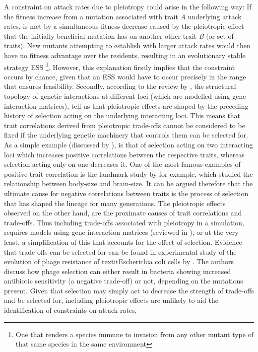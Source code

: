 \documentclass[a4paper]{report}
\begin{document}
 A constraint on attack rates due to pleiotropy could arise in the following way: If the fitness increase from a mutation associated with trait \textit{A} underlying attack rates, is met by a simultaneous fitness decrease caused by the pleiotropic effect that the initially beneficial mutation has on another other trait \textit{B} (or set of traits). New mutants attempting to establish with larger attack rates would then have no fitness advantage over the residents, resulting in an evolutionary stable strategy ESS \footnote{One that renders a species immune to invasion from any other mutant type of that same species in the same environment}. However, this explanation firstly implies that the constraint occurs by chance, given that an ESS would have to occur precisely in the range that ensures feasibility. Secondly, according to the review by \citep{Cheverud2015}, the structural topology of genetic interactions at different loci (which are modelled using gene interaction matrices), tell us that pleiotropic effects are shaped by the preceding history of selection acting on the underlying interacting loci. This means that trait correlations derived from pleiotropic trade-offs cannot be considered to be fixed if the underlying genetic machinery that controls them can be selected for. As a simple example (discussed by \citep{Cheverud2015}), is that of selection acting on two interacting loci which increases positive correlations between the respective traits, whereas selection acting only on one decreases it. One of the most famous examples of positive trait correlation is the landmark study by \citep{Lande1979} for example, which studied the relationship between body-size and brain-size. It can be argued therefore that the ultimate cause for negative correlations between traits is the process of selection that has shaped the lineage for many generations. The pleiotropic effects observed on the other hand, are the proximate causes of trait correlations and trade-offs. Thus including trade-offs associated with pleiotropy in a simulation, requires models using gene interaction matrices (reviewed in \citep{Cheverud2015}), or at the very least, a simplification of this that accounts for the effect of selection. Evidence that trade-offs can be selected for can be found in experimental study of the evolution of phage resistance of textit{Escherichia coli} cells by \citep{Burmeister2020}. The authors discuss how phage selection can either result in bacteria showing increased antibiotic sensitivity (a negative trade-off) or not, depending on the mutations present. Given that selection may simply act to decrease the strength of trade-offs and be selected for, including pleiotropic effects are unlikely to aid the identification of constraints on attack rates.\\
\end{document}
